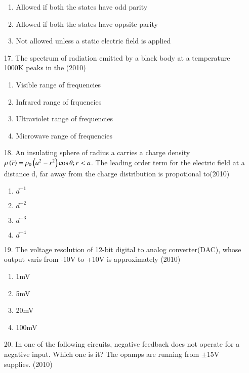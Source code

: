 \documentclass[journal]{IEEEtran}
\begin{document}
\begin{enumerate}
\begin{enumerate}[label=(\Alph*)]
        \item Allowed if both the states have odd parity
        \item Allowed if both the states have oppsite parity
        \item Not allowed unless a static electric field is applied
    \end{enumerate}
    \item[17.] The spectrum of radiation emitted by a black body at a temperature 1000K peaks in the \hfill (2010)
    \begin{enumerate}[label=(\Alph*)]
        \item Visible range of frequencies 
        \item Infrared range of frquencies 
        \item Ultraviolet range of frequencies
        \item Microwave range of frequencies
    \end{enumerate}
    \item[18.] An insulating sphere of radius a carries a charge density $\rho \left(\bar{r}\right)=\rho_0\left(a^2-r^2\right)\cos\theta; r<a$. The leading order term for the electric field at a distance d, far away from the charge distribution is propotional to\hfill (2010)
    \begin{enumerate}[label=(\Alph*)]
        \item $d^{-1}$
        \item $d^{-2}$
        \item $d^{-3}$
        \item $d^{-4}$
    \end{enumerate}
    \item[19.] The voltage resolution of 12-bit digital to analog converter(DAC), whose output varis from -10V to +10V is approximately  \hfill (2010)
    \begin{enumerate}[label=(\Alph*)]
        \item 1mV
        \item 5mV
        \item 20mV
        \item 100mV
    \end{enumerate}
    \item[20.] In one of the following circuits, negative feedback does not operate for a negative input. Which one is it? The opamps are running from $\pm$15V supplies. \hfill (2010)
    \begin{figure}[!ht]
        \centering

\end{figure}
\end{enumerate}
\end{document}
